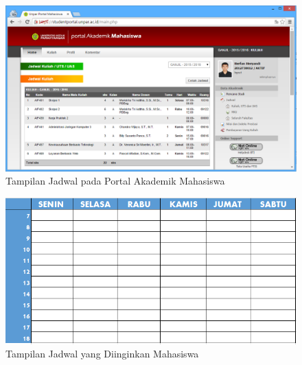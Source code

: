 \begin{enumerate}
\begin{figure}[H]
			\centering
			\includegraphics[scale=0.5]{Gambar/jadwal-portal}
			\caption{Tampilan Jadwal pada Portal Akademik Mahasiswa} 
			\label{fig:3_jadwal_portal}
		\end{figure}
		
		\begin{figure}[H]
			\centering
			\includegraphics[scale=0.5]{Gambar/jadwal-rekap}
			\caption{Tampilan Jadwal yang Diinginkan Mahasiswa} 
			\label{fig:3_jadwal_rekap}
		\end{figure}
		

\end{enumerate}
